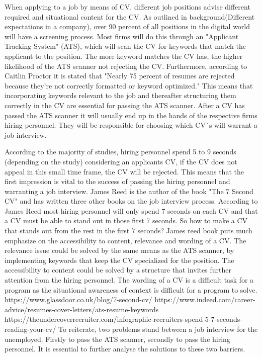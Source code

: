 When applying to a job by means of CV, different job positions advise different required and situational content for the CV.
As outlined in background(Different expectations in a company), over 90 percent of all positions in the digital world will have a screening process.
Most firms will do this through an "Applicant Tracking System" (ATS), which will scan the CV for keywords that match the applicant to the position.
The more keyword matches the CV has, the higher likelihood of the ATS scanner not rejecting the CV.
Furthermore, according to Caitlin Proctor it is stated that "Nearly 75 percent of resumes are rejected because they’re not correctly formatted or keyword optimized."
This means that incorporating keywords relevant to the job and thereafter structuring them correctly in the CV are essential for passing the ATS scanner.
After a CV has passed the ATS scanner it will usually end up in the hands of the respective firms hiring personnel. 
They will be responsible for choosing which CV´s will warrant a job interview.

According to the majority of studies, hiring personnel spend 5 to 9 seconds (depending on the study) considering an applicants CV, if the CV does not appeal in this small time frame, the CV will be rejected.
This means that the first impression is vital to the success of passing the hiring personnel and warranting a job interview.
James Reed is the author of the book "The 7 Second CV" and has written three other books on the job interview process.
According to James Reed most hiring personnel will only spend 7 seconds on each CV and that a CV must be able to stand out in those first 7 seconds.
So how to make a CV that stands out from the rest in the first 7 seconds?
James reed book puts much emphasize on the accessibility to content, relevance and wording of a CV.
The relevance issue could be solved by the same means as the ATS scanner, by implementing keywords that keep the CV specialized for the position.
The accessibility to content could be solved by a structure that invites further attention from the hiring personnel.
The wording of a CV is a difficult task for a program as the situational awareness of context is difficult for a program to solve.
https://www.glassdoor.co.uk/blog/7-second-cv/
https://www.indeed.com/career-advice/resumes-cover-letters/ats-resume-keywords
https://theundercoverrecruiter.com/infographic-recruiters-spend-5-7-seconds-reading-your-cv/
To reiterate, two problems stand between a job interview for the unemployed.
Firstly to pass the ATS scanner, secondly to pass the hiring personnel.
It is essential to further analyse the solutions to these two barriers. 

